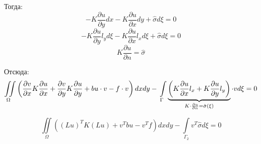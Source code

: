 	Тогда:
	\[-K \frac{\partial u}{\partial y} dx -K \frac{\partial u}{\partial x} dy + \hat \sigma d\xi = 0\]
	\[-K \frac{\partial u}{\partial y} l_y d\xi -K \frac{\partial u}{\partial x} l_x d\xi + \hat \sigma d\xi = 0\]
	\[K \frac{\partial u}{\partial n} = \hat \sigma\]
	
	Отсюда:
	\begin{equation}\label{2d_eq_2}
	\iint \limits_{\Omega} \left(\frac{\partial v}{\partial x} K \frac{\partial u}{\partial x} + \frac{\partial v}{\partial y} K \frac{\partial u}{\partial y} + bu \cdot v - f \cdot v\right) dx dy - \\
	\int \limits_{\Gamma} \underbrace{ \left(K \frac{\partial u}{\partial x} l_x + K \frac{\partial u}{\partial y} l_y\right)}_{K \cdot \frac{\partial u}{\partial n} = \hat \sigma(\xi)}  \cdot v d\xi = 0 
	\end{equation}
	
	\[\iint \limits_{\Omega} ((Lu)^T K (Lu) + v^T bu - v^T f) dxdy - \int \limits_{\Gamma_2} v^T \hat \sigma d\xi = 0\]